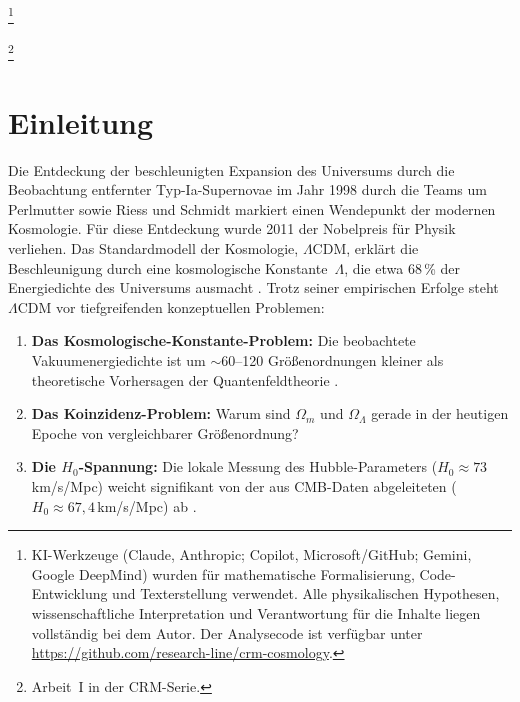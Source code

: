 \documentclass[aps,prd,twocolumn,superscriptaddress,nofootinbib]{revtex4-2}
\begin{document}

\thanks{KI-Werkzeuge (Claude, Anthropic; Copilot, Microsoft/GitHub; Gemini, Google DeepMind) wurden für mathematische Formalisierung, Code-Entwicklung und Texterstellung verwendet. Alle physikalischen Hypothesen, wissenschaftliche Interpretation und Verantwortung für die Inhalte liegen vollständig bei dem Autor. Der Analysecode ist verfügbar unter \url{https://github.com/research-line/crm-cosmology}.}

\thanks{Arbeit~I in der CRM-Serie.}

\maketitle


\section{Einleitung}
\label{sec:einleitung}

Die Entdeckung der beschleunigten Expansion des Universums durch die Beobachtung entfernter Typ-Ia-Supernovae im Jahr 1998 durch die Teams um Perlmutter \cite{Perlmutter1999} sowie Riess und Schmidt \cite{Riess1998} markiert einen Wendepunkt der modernen Kosmologie. F\"ur diese Entdeckung wurde 2011 der Nobelpreis f\"ur Physik verliehen. Das Standardmodell der Kosmologie, $\Lambda$CDM, erkl\"art die Beschleunigung durch eine kosmologische Konstante~$\Lambda$, die etwa 68\,\% der Energiedichte des Universums ausmacht \cite{Planck2020}. Trotz seiner empirischen Erfolge steht $\Lambda$CDM vor tiefgreifenden konzeptuellen Problemen:

\begin{enumerate}
\item \textbf{Das Kosmologische-Konstante-Problem:} Die beobachtete Vakuumenergiedichte ist um $\sim$60--120 Gr\"o\ss{}enordnungen kleiner als theoretische Vorhersagen der Quantenfeldtheorie \cite{Weinberg1989}.
\item \textbf{Das Koinzidenz-Problem:} Warum sind $\Omega_m$ und $\Omega_\Lambda$ gerade in der heutigen Epoche von vergleichbarer Gr\"o\ss{}enordnung?
\item \textbf{Die $H_0$-Spannung:} Die lokale Messung des Hubble-Parameters ($H_0 \approx 73$\,km/s/Mpc) weicht signifikant von der aus CMB-Daten abgeleiteten ($H_0 \approx 67{,}4$\,km/s/Mpc) ab \cite{Planck2020, Riess2022}.
\end{enumerate}
\end{document}
